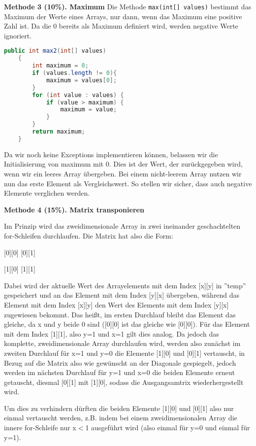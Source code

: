 \documentclass{pi1}
\begin{document}
\textbf{Methode 3 (10\%). Maximum}
Die Methode \texttt{max(int[] values)} bestimmt das Maximum der Werte eines Arrays, nur dann, wenn das Maximum eine positive Zahl ist. Da die 0 bereits als Maximum definiert wird, werden negative Werte ignoriert.

\begin{lstlisting}[caption={Korrigierte max() Methode}, firstnumber=81, language=Java]
public int max2(int[] values)
    {
        int maximum = 0;
        if (values.length != 0){
            maximum = values[0];
        }
        for (int value : values) {
            if (value > maximum) {
                maximum = value;
            }
        }
        return maximum;
    }
\end{lstlisting}

Da wir noch keine Exceptions implementieren können, belassen wir die Initialisierung von maximum mit 0. Dies ist der Wert, der zurückgegeben wird, wenn wir ein leeres Array übergeben. Bei einem nicht-leerem Array nutzen wir nun das erste Element als Vergleichswert. So stellen wir sicher, dass auch negative Elemente verglichen werden.

\textbf{Methode 4 (15\%). Matrix transponieren}

Im Prinzip wird das zweidimensionale Array in zwei ineinander geschachtelten for-Schleifen durchlaufen. Die Matrix hat also die Form:

[0][0]  [0][1]

[1][0]  [1][1]

Dabei wird der aktuelle Wert des Arrayelements mit dem Index [x][y] in ''temp'' gespeichert und an das Element mit dem Index [y][x] übergeben, während das Element mit dem Index [x][y] den Wert des Elements mit dem Index [y][x] zugewiesen bekommt. Das heißt, im ersten Durchlauf bleibt das Element das gleiche, da x und y beide 0 sind ([0][0] ist das gleiche wie [0][0]). Für das Element mit dem Index [1][1], also y=1 und x=1 gilt dies analog. Da jedoch das komplette, zweidimensionale Array durchlaufen wird, werden also zunächst im zweiten Durchlauf für x=1 und y=0 die Elemente [1][0] und [0][1] vertauscht, in Bezug auf die Matrix also wie gewünscht an der Diagonale gespiegelt, jedoch werden im nächsten Durchlauf für y=1 und x=0 die beiden Elemente erneut getauscht, diesmal [0][1] mit [1][0], sodass die Ausgangsamtrix wiederhergestellt wird. 

Um dies zu verhindern dürften die beiden Elemente [1][0] und [0][1] also nur einmal vertauscht werden, z.B. indem bei einem zweidimensionalen Array die innere for-Schleife nur x$<$1 ausgeführt wird (also einmal für y=0 und einmal für y=1).
\end{document}
